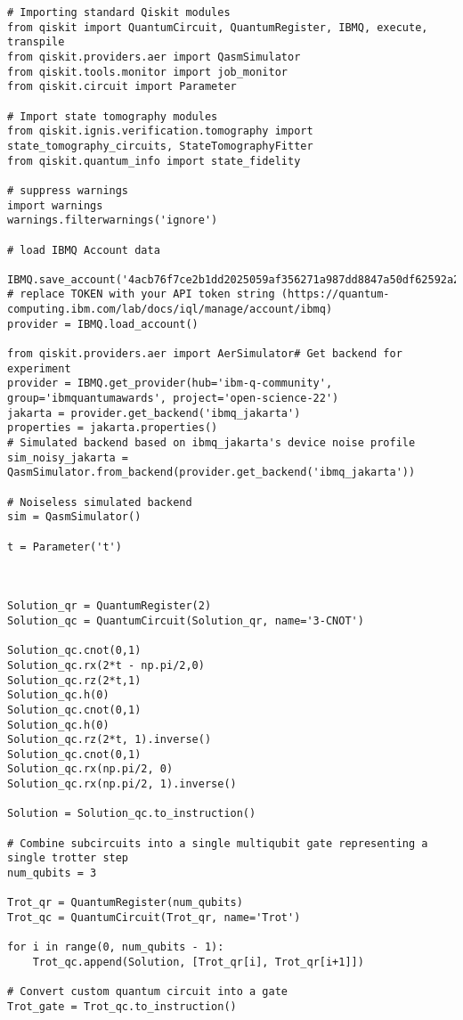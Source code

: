 \begin{verbatim}
# Importing standard Qiskit modules
from qiskit import QuantumCircuit, QuantumRegister, IBMQ, execute, transpile
from qiskit.providers.aer import QasmSimulator
from qiskit.tools.monitor import job_monitor
from qiskit.circuit import Parameter

# Import state tomography modules
from qiskit.ignis.verification.tomography import state_tomography_circuits, StateTomographyFitter
from qiskit.quantum_info import state_fidelity

# suppress warnings
import warnings
warnings.filterwarnings('ignore')

# load IBMQ Account data

IBMQ.save_account('4acb76f7ce2b1dd2025059af356271a987dd8847a50df62592a24e095f97bcd306f7849065035905726db6c09803bcd3db7ab05ed85e63dbfd427910b329c181')  # replace TOKEN with your API token string (https://quantum-computing.ibm.com/lab/docs/iql/manage/account/ibmq)
provider = IBMQ.load_account()

from qiskit.providers.aer import AerSimulator# Get backend for experiment
provider = IBMQ.get_provider(hub='ibm-q-community', group='ibmquantumawards', project='open-science-22')
jakarta = provider.get_backend('ibmq_jakarta')
properties = jakarta.properties()
# Simulated backend based on ibmq_jakarta's device noise profile
sim_noisy_jakarta = QasmSimulator.from_backend(provider.get_backend('ibmq_jakarta'))

# Noiseless simulated backend
sim = QasmSimulator()

t = Parameter('t')



Solution_qr = QuantumRegister(2)
Solution_qc = QuantumCircuit(Solution_qr, name='3-CNOT')

Solution_qc.cnot(0,1)
Solution_qc.rx(2*t - np.pi/2,0)
Solution_qc.rz(2*t,1)
Solution_qc.h(0)
Solution_qc.cnot(0,1)
Solution_qc.h(0)
Solution_qc.rz(2*t, 1).inverse()
Solution_qc.cnot(0,1)
Solution_qc.rx(np.pi/2, 0)
Solution_qc.rx(np.pi/2, 1).inverse()

Solution = Solution_qc.to_instruction()

# Combine subcircuits into a single multiqubit gate representing a single trotter step
num_qubits = 3

Trot_qr = QuantumRegister(num_qubits)
Trot_qc = QuantumCircuit(Trot_qr, name='Trot')

for i in range(0, num_qubits - 1):
    Trot_qc.append(Solution, [Trot_qr[i], Trot_qr[i+1]])

# Convert custom quantum circuit into a gate
Trot_gate = Trot_qc.to_instruction()


\end{verbatim}
